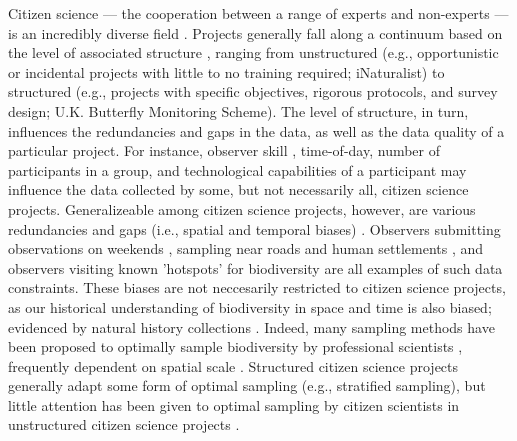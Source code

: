 \documentclass[9pt,twocolumn,twoside,lineno]{pnas-new}
\begin{document}
Citizen science --- the cooperation between a range of experts and non-experts  --- is an incredibly diverse field \cite{jordan2015citizen}. Projects generally fall along a continuum based on the level of associated structure \cite{kelling2019using, welvaert2016citizen}, ranging from unstructured (e.g., opportunistic or incidental projects with little to no training required; iNaturalist) to structured (e.g., projects with specific objectives, rigorous protocols, and survey design; U.K. Butterfly Monitoring Scheme). The level of structure, in turn, influences the redundancies and gaps in the data, as well as the data quality of a particular project. For instance, observer skill \cite{kelling2015can}, time-of-day, number of participants in a group, and technological capabilities of a participant may influence the data collected by some, but not necessarily all, citizen science projects. Generalizeable among citizen science projects, however, are various redundancies and gaps (i.e., spatial and temporal biases) \cite{boakes2010distorted, bird2014statistical}. Observers submitting observations on weekends \cite{courter2013weekend}, sampling near roads and human settlements \cite{kelling2015taking}, and observers visiting known 'hotspots' for biodiversity \cite{geldmann2016determines} are all examples of such data constraints. These biases are not neccesarily restricted to citizen science projects, as our historical understanding of biodiversity in space and time is also biased; evidenced by natural history collections \cite{pyke2010biological, boakes2010distorted}. Indeed, many sampling methods have been proposed to optimally sample biodiversity by professional scientists \cite{etienne2005new, moreno2000assessing, colwell1994estimating, longino1997biodiversity, ferrarini2012biodiversity}, frequently dependent on spatial scale \cite{chase2013scale}. Structured citizen science projects generally adapt some form of optimal sampling (e.g., stratified sampling), but little attention has been given to optimal sampling by citizen scientists in unstructured citizen science projects \cite{harrison2014assessing}.
\end{document}
